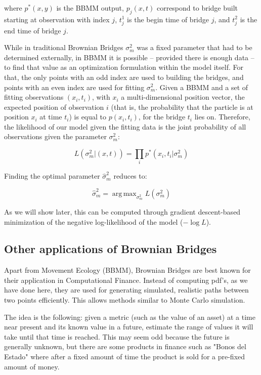 \documentclass[12pt]{article}
\DeclareMathOperator*{\argmax}{arg\,max}
\begin{document}
where $p^*(x,y)$ is the BBMM output, $p_j(x,t)$ correspond to bridge built starting at observation with index $j$, $t_j^1$ is the begin time of bridge $j$, and $t_j^2$ is the end time of bridge $j$.

While in traditional Brownian Bridges $\sigma_m^2$ was a fixed parameter that had to be determined externally, in BBMM it is possible -- provided there is enough data -- to find that value as an optimization formulation within the model itself. For that, the only points with an odd index are used to building the bridges, and points with an even index are used for fitting $\sigma_m^2$. Given a BBMM and a set of fitting observations $(x_i,t_i)$, with $x_i$ a multi-dimensional position vector, the expected position of observation $i$ (that is, the probability that the particle is at position $x_i$ at time $t_i$) is equal to $p(x_i,t_i)$, for the bridge $t_i$ lies on. Therefore, the likelihood of our model given the fitting data is the joint probability of all observations given the parameter $\sigma_m^2$:

\[ L(\sigma_m^2 | (x,t)) = \prod_i p^*(x_i,t_i|\sigma_m^2) \]

Finding the optimal parameter $\hat{\sigma}_m^2$ reduces to:

\[ \hat{\sigma}_m^2 = \argmax_{\sigma_m^2} L(\sigma_m^2) \]

As we will show later, this can be computed through gradient descent-based minimization of the negative log-likelihood of the model ($-\log L$).


\subsection{Other applications of Brownian Bridges}

Apart from Movement Ecology (BBMM), Brownian Bridges are best known for their application in Computational Finance. Instead of computing pdf's, as we have done here, they are used for generating simulated, realistic paths between two points efficiently. This allows methods similar to Monte Carlo simulation.

The idea is the following: given a metric (such as the value of an asset) at a time near present and its known value in a future, estimate the range of values it will take until that time is reached. This may seem odd because the future is generally unknown, but there are some products in finance such as "Bonos del Estado" where after a fixed amount of time the product is sold for a pre-fixed amount of money.
\end{document}
